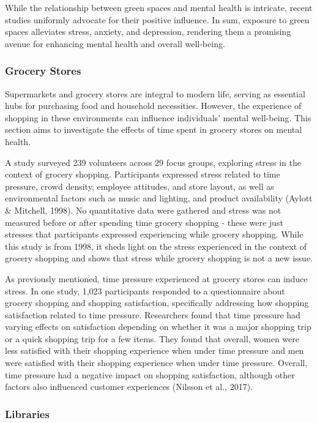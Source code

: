 \documentclass[
  letterpaper,
  number,
  review,
  3p]{elsarticle}
\begin{document}
While the relationship between green spaces and mental health is
intricate, recent studies uniformly advocate for their positive
influence. In sum, exposure to green spaces alleviates stress, anxiety,
and depression, rendering them a promising avenue for enhancing mental
health and overall well-being.

\subsubsection{Grocery Stores}\label{grocery-stores}

Supermarkets and grocery stores are integral to modern life, serving as
essential hubs for purchasing food and household necessities. However,
the experience of shopping in these environments can influence
individuals' mental well-being. This section aims to investigate the
effects of time spent in grocery stores on mental health.

A study surveyed 239 volunteers across 29 focus groups, exploring stress
in the context of grocery shopping. Participants expressed stress
related to time pressure, crowd density, employee attitudes, and store
layout, as well as environmental factors such as music and lighting, and
product availability (Aylott \& Mitchell, 1998). No quantitative data
were gathered and stress was not measured before or after spending time
grocery shopping - these were just stresses that participants expressed
experiencing while grocery shopping. While this study is from 1998, it
sheds light on the stress experienced in the context of grocery shopping
and shows that stress while grocery shopping is not a new issue.

As previously mentioned, time pressure experienced at grocery stores can
induce stress. In one study, 1,023 participants responded to a
questionnaire about grocery shopping and shopping satisfaction,
specifically addressing how shopping satisfaction related to time
pressure. Researchers found that time pressure had varying effects on
satisfaction depending on whether it was a major shopping trip or a
quick shopping trip for a few items. They found that overall, women were
less satisfied with their shopping experience when under time pressure
and men were satisfied with their shopping experience when under time
pressure. Overall, time pressure had a negative impact on shopping
satisfaction, although other factors also influenced customer
experiences (Nilsson et al., 2017).

\subsubsection{Libraries}\label{libraries}
\end{document}
